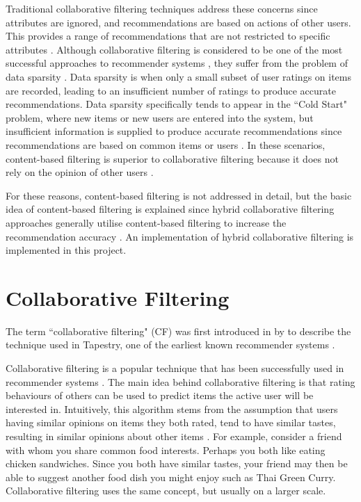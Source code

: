 Traditional collaborative filtering techniques address these concerns since attributes are ignored, and recommendations are based on actions of other users. This provides a range of recommendations that are not restricted to specific attributes \cite{koren2009matrix}. Although collaborative filtering is considered to be one of the most successful approaches to recommender systems \cite{survey, toward}, they suffer from the problem of data sparsity \cite{toward, survey, itembased, koren2009matrix, koren2011, dimension}. Data sparsity is when only a small subset of user ratings on items are recorded, leading to an insufficient number of ratings to produce accurate recommendations. Data sparsity specifically tends to appear in the ``Cold Start" problem, where new items or new users are entered into the system, but insufficient information is supplied to produce accurate recommendations since recommendations are based on common items or users \cite{survey}. In these scenarios, content-based filtering is superior to collaborative filtering because it does not rely on the opinion of other users \cite{koren2009matrix}.

For these reasons, content-based filtering is not addressed in detail, but the basic idea of content-based filtering is explained since hybrid collaborative filtering approaches generally utilise content-based filtering to increase the recommendation accuracy \cite{survey}. An implementation of hybrid collaborative filtering is implemented in this project.  

\section{Collaborative Filtering}

The term ``collaborative filtering" (CF) was first introduced in \citeyear{goldberg1992using} by \citeauthor{goldberg1992using} \cite{goldberg1992using} to describe the technique used in Tapestry, one of the earliest known recommender systems \cite{koren2009matrix,  goldberg1992using, itembased, survey}.

Collaborative filtering is a popular technique that has been successfully used in recommender systems \cite{itembased, schafer2007collaborative, survey}. The main idea behind collaborative filtering is that rating behaviours of others can be used to predict items the active user will be interested in. Intuitively, this algorithm stems from the assumption that users having similar opinions on items they both rated, tend to have similar tastes, resulting in similar opinions about other items \cite{schafer2007collaborative}. For example, consider a friend with whom you share common food interests. Perhaps you both like eating chicken sandwiches. Since you both have similar tastes, your friend may then be able to suggest another food dish you might enjoy such as Thai Green Curry. Collaborative filtering uses the same concept, but usually on a larger scale. 

